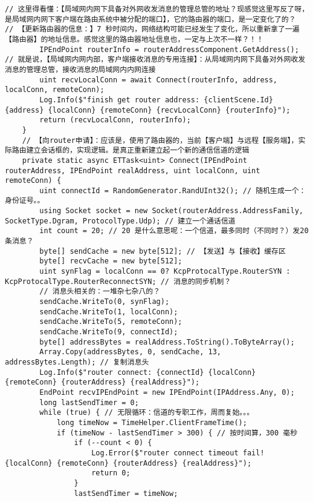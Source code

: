 \documentclass[9pt, b5paper]{article}
\begin{document}
\begin{verbatim}
// 这里得看懂：【局域网内网下具备对外网收发消息的管理总管的地址？现感觉这里写反了呀，是局域网内网下客户端在路由系统中被分配的端口】，它的路由器的端口，是一定变化了的？
// 【更新路由器的信息：】7 秒时间内，网络结构可能已经发生了变化，所以重新拿了一遍【路由器】的地址信息。感觉这里的路由器地址信息也，一定与上次不一样？！！
        IPEndPoint routerInfo = routerAddressComponent.GetAddress(); 
// 就是说，【局域网内网内部，客户端接收消息的专用连接】：从局域网内网下具备对外网收发消息的管理总管，接收消息的局域网内内网连接
        uint recvLocalConn = await Connect(routerInfo, address, localConn, remoteConn); 
        Log.Info($"finish get router address: {clientScene.Id} {address} {localConn} {remoteConn} {recvLocalConn} {routerInfo}");
        return (recvLocalConn, routerInfo);
    }
    // 【向router申请】：应该是，使用了路由器的，当前【客户端】与远程【服务端】，实际路由建立会话框的，实现逻辑。是真正重新建立起一个新的通信信道的逻辑
    private static async ETTask<uint> Connect(IPEndPoint routerAddress, IPEndPoint realAddress, uint localConn, uint remoteConn) {
        uint connectId = RandomGenerator.RandUInt32(); // 随机生成一个：身份证号。。
        using Socket socket = new Socket(routerAddress.AddressFamily, SocketType.Dgram, ProtocolType.Udp); // 建立一个通话信道
        int count = 20; // 20 是什么意思呢：一个信道，最多同时（不同时？）发20 条消息？
        byte[] sendCache = new byte[512]; // 【发送】与【接收】缓存区
        byte[] recvCache = new byte[512];
        uint synFlag = localConn == 0? KcpProtocalType.RouterSYN : KcpProtocalType.RouterReconnectSYN; // 消息的同步机制？
        // 消息头相关的：一堆杂七杂八的？
        sendCache.WriteTo(0, synFlag);
        sendCache.WriteTo(1, localConn);
        sendCache.WriteTo(5, remoteConn);
        sendCache.WriteTo(9, connectId);
        byte[] addressBytes = realAddress.ToString().ToByteArray();
        Array.Copy(addressBytes, 0, sendCache, 13, addressBytes.Length); // 复制消息头
        Log.Info($"router connect: {connectId} {localConn} {remoteConn} {routerAddress} {realAddress}");
        EndPoint recvIPEndPoint = new IPEndPoint(IPAddress.Any, 0);
        long lastSendTimer = 0;
        while (true) { // 无限循环：信道的专职工作，周而复始。。。
            long timeNow = TimeHelper.ClientFrameTime();
            if (timeNow - lastSendTimer > 300) { // 按时间算，300 毫秒
                if (--count < 0) {
                    Log.Error($"router connect timeout fail! {localConn} {remoteConn} {routerAddress} {realAddress}");
                    return 0;
                }
                lastSendTimer = timeNow;

\end{verbatim}
\end{document}
